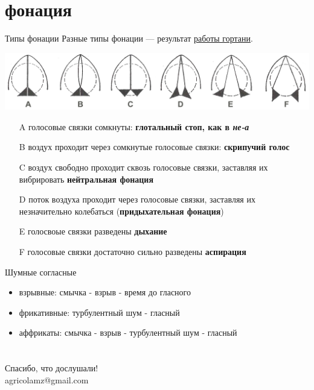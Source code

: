 \section{фонация}
\begin{frame}{Типы фонации}
Разные типы фонации --- результат \href{https://www.youtube.com/watch?v=b89RSYCaUBo}{работы гортани}.

\includegraphics[width=\linewidth]{11-glottis-positions.png}

\begin{itemize}
\item[A] голосовые связки сомкнуты: \textbf{глотальный стоп, как в \textit{не-а}}
\item[B] воздух проходит через сомкнутые голосовые связки: \textbf{скрипучий голос}
\item[C]  воздух свободно проходит сквозь голосовые связки, заставляя их вибрировать \textbf{нейтральная фонация}
\item[D] поток воздуха проходит через голосовые связки, заставляя их незначительно колебаться (\textbf{придыхательная фонация})
\item[E]  голосвоые связки разведены \textbf{дыхание}
\item[F] голосовые связки достаточно сильно разведены \textbf{аспирация}
\end{itemize}
\end{frame}

\begin{frame}{Шумные согласные}
\begin{itemize}
\item взрывные: смычка - взрыв - время до гласного
\item фрикативные: турбулентный шум - гласный
\item аффрикаты: смычка - взрыв - турбулентный шум - гласный
\end{itemize}
\end{frame}

\section{}
\begin{frame}
{\huge Спасибо, что дослушали!\bigskip\\
agricolamz@gmail.com
\vspace{-130pt}}
\end{frame}

